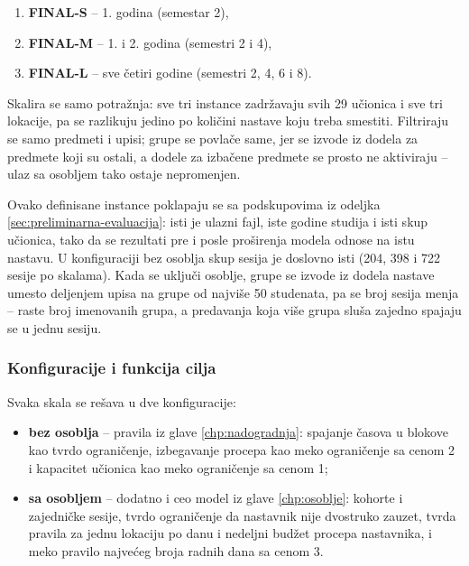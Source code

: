 \documentclass[12pt,oneside]{memoir}
\begin{document}
\begin{enumerate}
\item \textbf{FINAL-S} -- 1. godina (semestar 2),
\item \textbf{FINAL-M} -- 1. i 2. godina (semestri 2 i 4),
\item \textbf{FINAL-L} -- sve četiri godine (semestri 2, 4, 6 i 8).
\end{enumerate}

Skalira se samo potražnja: sve tri instance zadržavaju svih 29 učionica
i sve tri lokacije, pa se razlikuju jedino po količini nastave koju
treba smestiti. Filtriraju se samo predmeti i upisi; grupe se povlače
same, jer se izvode iz dodela za predmete koji su ostali, a dodele za
izbačene predmete se prosto ne aktiviraju -- ulaz sa osobljem tako
ostaje nepromenjen.

Ovako definisane instance poklapaju se sa podskupovima iz odeljka
\ref{sec:preliminarna-evaluacija}: isti je ulazni fajl, iste godine studija i isti
skup učionica, tako da se rezultati pre i posle proširenja modela
odnose na istu nastavu. U konfiguraciji bez osoblja skup sesija je
doslovno isti (204, 398 i 722 sesije po skalama). Kada se uključi
osoblje, grupe se izvode iz dodela nastave umesto deljenjem upisa na
grupe od najviše 50 studenata, pa se broj sesija menja -- raste broj
imenovanih grupa, a predavanja koja više grupa sluša zajedno spajaju se
u jednu sesiju.

\subsubsection{Konfiguracije i funkcija cilja}

Svaka skala se rešava u dve konfiguracije:

\begin{itemize}
\item \textbf{bez osoblja} -- pravila iz glave \ref{chp:nadogradnja}:
  spajanje časova u blokove kao tvrdo ograničenje, izbegavanje procepa
  kao meko ograničenje sa cenom 2 i kapacitet učionica kao meko
  ograničenje sa cenom 1;
\item \textbf{sa osobljem} -- dodatno i ceo model iz glave
  \ref{chp:osoblje}: kohorte i zajedničke sesije, tvrdo ograničenje da
  nastavnik nije dvostruko zauzet, tvrda pravila za jednu lokaciju po
  danu i nedeljni budžet procepa nastavnika, i meko pravilo najvećeg
  broja radnih dana sa cenom 3.
\end{itemize}
\end{document}
